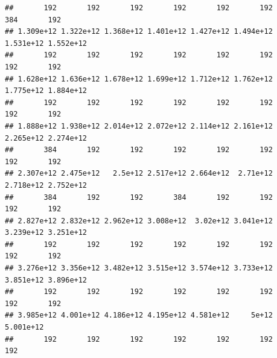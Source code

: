 \documentclass[
]{article}
\newenvironment{Shaded}{\begin{snugshade}}{\end{snugshade}}
\newcommand{\FunctionTok}[1]{\textcolor[rgb]{0.13,0.29,0.53}{\textbf{#1}}}
\newcommand{\NormalTok}[1]{#1}
\newcommand{\SpecialCharTok}[1]{\textcolor[rgb]{0.81,0.36,0.00}{\textbf{#1}}}
\begin{document}
\begin{verbatim}
##       192       192       192       192       192       192       384       192 
## 1.309e+12 1.322e+12 1.368e+12 1.401e+12 1.427e+12 1.494e+12 1.531e+12 1.552e+12 
##       192       192       192       192       192       192       192       192 
## 1.628e+12 1.636e+12 1.678e+12 1.699e+12 1.712e+12 1.762e+12 1.775e+12 1.884e+12 
##       192       192       192       192       192       192       192       192 
## 1.888e+12 1.938e+12 2.014e+12 2.072e+12 2.114e+12 2.161e+12 2.265e+12 2.274e+12 
##       384       192       192       192       192       192       192       192 
## 2.307e+12 2.475e+12   2.5e+12 2.517e+12 2.664e+12  2.71e+12 2.718e+12 2.752e+12 
##       384       192       192       384       192       192       192       192 
## 2.827e+12 2.832e+12 2.962e+12 3.008e+12  3.02e+12 3.041e+12 3.239e+12 3.251e+12 
##       192       192       192       192       192       192       192       192 
## 3.276e+12 3.356e+12 3.482e+12 3.515e+12 3.574e+12 3.733e+12 3.851e+12 3.896e+12 
##       192       192       192       192       192       192       192       192 
## 3.985e+12 4.001e+12 4.186e+12 4.195e+12 4.581e+12     5e+12 5.001e+12 
##       192       192       192       192       192       192       192
\end{verbatim}

\begin{Shaded}
\end{Shaded}
\end{document}
